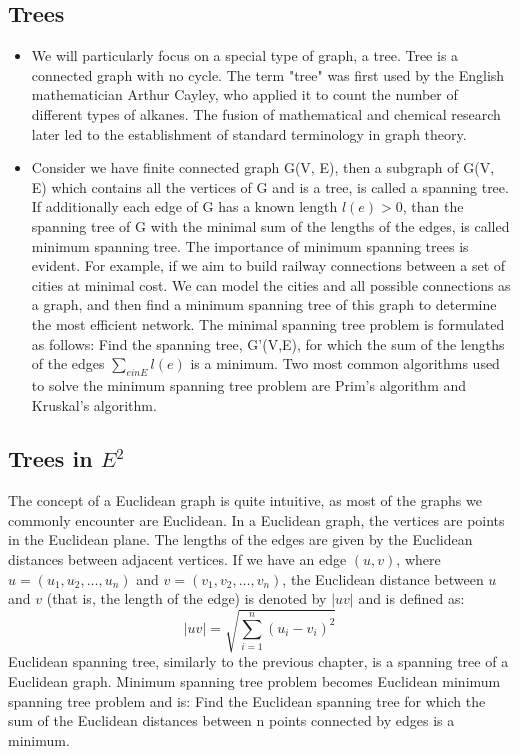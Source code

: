 \documentclass[12pt]{article}
\begin{document}
	\subsection{Trees}
	\begin{itemize} 
		\item We will particularly focus on a special type of graph, a tree.
		Tree is a connected graph with no cycle.
		The term "tree" was first used by the English mathematician Arthur Cayley, who applied it to count the number of different types of alkanes. The fusion of mathematical and chemical research later led to the establishment of standard terminology in graph theory.
		
		\item Consider we have finite connected graph G(V, E), then a subgraph of G(V, E) which contains all the vertices of G and is a tree, is called a spanning tree. If additionally each edge of G has a known length \(l(e)>0\), than the spanning tree of G with the minimal sum of the lengths of the edges, is called minimum spanning tree. The importance of minimum spanning trees is evident. For example, if we aim to build railway connections between a set of cities at minimal cost. We can model the cities and all possible connections as a graph, and then find a minimum spanning tree of this graph to determine the most efficient network. 
		The minimal spanning tree problem is formulated as follows: Find the spanning tree, G'(V,E), for which the sum of the lengths of the edges \( \sum_{ein E} l(e)\) is a minimum. Two most common algorithms used to solve the minimum spanning tree problem are Prim's algorithm and Kruskal's algorithm.
	\end{itemize}		

	\subsection{Trees in \(E^2\)}
		The concept of a Euclidean graph is quite intuitive, as most of the graphs we commonly encounter are Euclidean. In a Euclidean graph, the vertices are points in the Euclidean plane. The lengths of the edges are given by the Euclidean distances between adjacent vertices. If we have an edge \( (u, v) \), where \( u = (u_1, u_2, \dots, u_n) \) and \( v = (v_1, v_2, \dots, v_n) \), the Euclidean distance between \( u \) and \( v \) (that is, the length of the edge) is denoted by \( |uv| \) and is defined as:
		\[
		|uv| = \sqrt{ \sum_{i=1}^{n} (u_i - v_i)^2 }
		\]
		Euclidean spanning tree, similarly to the previous chapter, is a spanning tree of a Euclidean graph. Minimum spanning tree problem becomes Euclidean minimum spanning tree problem and is: Find the Euclidean spanning tree for which the sum of the Euclidean distances between n points connected by edges is a minimum. 
	
\end{document}
